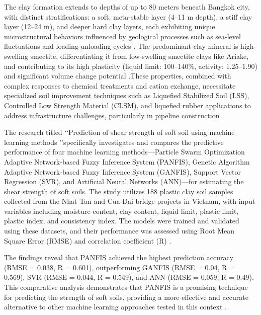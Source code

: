 \documentclass[12pt,a4paper]{article}
\begin{document}
	The clay formation extends to depths of up to 80 meters beneath Bangkok city, with distinct stratifications: a soft, meta-stable layer (4–11 m depth), a stiff clay layer (12–24 m), and deeper hard clay layers, each exhibiting unique microstructural behaviors influenced by geological processes such as sea-level fluctuations and loading-unloading cycles \cite{Krit_Saowiang_Pham_Huy_Giao_2019}. The predominant clay mineral is high-swelling smectite, differentiating it from low-swelling smectite clays like Ariake, and contributing to its high plasticity (liquid limit: 100–140\%, activity: 1.25–1.90) and significant volume change potential \cite{OHTSUBO200011}.These properties, combined with complex responses to chemical treatments and cation exchange, necessitate specialized soil improvement techniques such as Liquefied Stabilized Soil (LSS), Controlled Low Strength Material (CLSM), and liquefied rubber applications to address infrastructure challenges, particularly in pipeline construction \cite{Prum_Jumnongpol_Eamchotchawalit_Kantiwattanakul_Sooksatra_Jarearnsiri_Passananon_2019}.
	
	The research titled \lq\lq Prediction of shear strength of soft soil using machine learning methods \rq\rq specifically investigates and compares the predictive performance of four machine learning methods—Particle Swarm Optimization Adaptive Network-based Fuzzy Inference System (PANFIS), Genetic Algorithm Adaptive Network-based Fuzzy Inference System (GANFIS), Support Vector Regression (SVR), and Artificial Neural Networks (ANN)—for estimating the shear strength of soft soils. The study utilizes 188 plastic clay soil samples collected from the Nhat Tan and Cua Dai bridge projects in Vietnam, with input variables including moisture content, clay content, liquid limit, plastic limit, plastic index, and consistency index. The models were trained and validated using these datasets, and their performance was assessed using Root Mean Square Error (RMSE) and correlation coefficient (R) \cite{PHAM2018181}.
	
	The findings reveal that PANFIS achieved the highest prediction accuracy (RMSE = 0.038, R = 0.601), outperforming GANFIS (RMSE = 0.04, R = 0.569), SVR (RMSE = 0.044, R = 0.549), and ANN (RMSE = 0.059, R = 0.49). This comparative analysis demonstrates that PANFIS is a promising technique for predicting the strength of soft soils, providing a more effective and accurate alternative to other machine learning approaches tested in this context \cite{PHAM2018181}.
	
\end{document}
